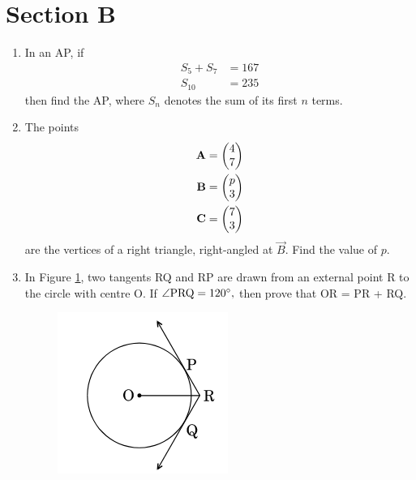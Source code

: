 \documentclass[journal,12pt,twocolumn]{IEEEtran}
\renewcommand\thesection{\arabic{section}}
\begin{document}
\section{Section B}
\renewcommand{\theequation}{\theenumi}
\begin{enumerate}[label=\thesection.\arabic*.,ref=\thesection.\theenumi]
\item In an AP, if 
\begin{align*}
 S_5 + S_7 &= 167\\  
 S_{10}&= 235
\end{align*}
then find the AP, where $S_n$ denotes the sum of its first $n$ terms.
\item The points 
\begin{align*}
 \mathbf{A}&= \begin{pmatrix}4 \\ 7\end{pmatrix}\\  
 \mathbf{B}&=\begin{pmatrix}p \\ 3\end{pmatrix}\\  
 \mathbf{C}&=\begin{pmatrix}7 \\ 3\end{pmatrix}
\end{align*}
are the vertices of a right triangle, right-angled at $ \vec{B} $. Find the value of $p$.
\item In Figure \ref{Figure 3}, two tangents RQ and RP are drawn from an external point R to the circle with centre O. If $\angle \text{PRQ} = 120 \degree,$ then prove that OR = PR + RQ.
  \begin{figure}[h!]
	\centering
    \includegraphics[width=0.8\columnwidth,center]{./figs/image3.png}
	\caption{}
	\label{Figure 3}
\end{figure}

\end{enumerate}
\end{document}

